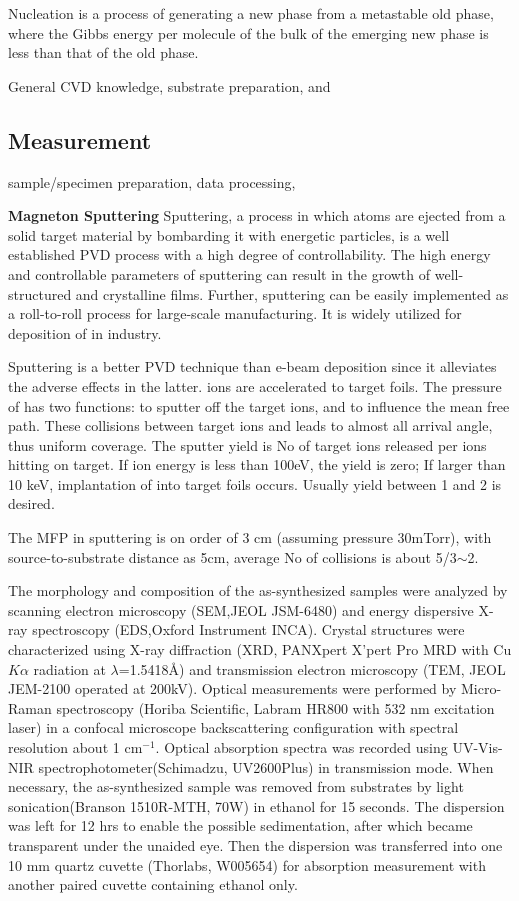 Nucleation is a process of generating a new phase from a metastable old phase, where the Gibbs energy per molecule of the bulk of the emerging new phase is less than that of the old phase.

  General CVD knowledge, substrate preparation, and\cite{MichealK.Zuraw2003}

\subsection{Measurement}
sample/specimen preparation, data processing,

\textbf{Magneton Sputtering} Sputtering, a process in which atoms are ejected from a solid target material by bombarding it with energetic particles, is a well established PVD process with a high degree of controllability. The high energy and controllable parameters of sputtering can result in the growth of well-structured and crystalline films. Further, sputtering can be easily implemented as a roll-to-roll process for large-scale manufacturing. It is widely utilized for deposition of  in industry.

Sputtering is a better PVD technique than e-beam deposition since it alleviates the adverse effects in the latter.  ions are accelerated to target foils. The pressure of  has two functions: to sputter off the target ions, and to influence the mean free path. These collisions between target ions and  leads to almost all arrival angle, thus uniform coverage. The sputter yield is No of target ions released per ions hitting on target. If  ion energy is less than 100eV, the yield is zero; If larger than 10 keV, implantation of  into target foils occurs. Usually yield between 1 and 2 is desired.

The MFP in sputtering is on order of 3 cm (assuming pressure 30mTorr), with source-to-substrate distance as 5cm, average No of collisions is about 5/3$\sim$2. 



The morphology and composition of the as-synthesized samples were analyzed by scanning electron microscopy (SEM,JEOL JSM-6480) and energy dispersive X-ray spectroscopy (EDS,Oxford Instrument INCA). Crystal structures were characterized using X-ray diffraction (XRD, PANXpert X’pert Pro MRD with Cu $K\alpha$ radiation at $\lambda$=1.5418\AA) and transmission electron microscopy (TEM, JEOL JEM-2100  operated at 200kV). Optical measurements were performed by Micro-Raman spectroscopy (Horiba Scientific, Labram HR800 with 532 nm excitation laser) in a confocal microscope backscattering configuration with spectral resolution about 1 cm$^{-1}$. Optical absorption spectra was recorded using UV-Vis-NIR spectrophotometer(Schimadzu, UV2600Plus) in transmission mode. When necessary, the as-synthesized sample was removed from substrates by light sonication(Branson 1510R-MTH, 70W) in ethanol for 15 seconds. The dispersion was left for 12 hrs to enable the possible sedimentation, after which became transparent under the unaided eye. Then the dispersion was transferred into one 10 mm quartz cuvette (Thorlabs, W005654) for absorption measurement with another paired cuvette containing ethanol only.




